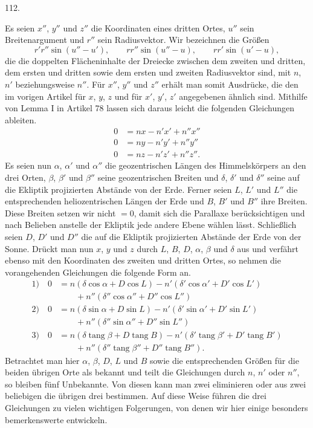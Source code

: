 \par{}\medskip
{}
\begin{center}112.\end{center}
Es seien $x''$, $y''$ und $z''$ die Koordinaten eines dritten Ortes, $u''$ sein Breitenargument und $r''$ sein Radiusvektor. Wir bezeichnen die Größen
\[
r'r''\sin(u''-u'),\qquad rr''\sin(u''-u),\qquad rr'\sin(u'-u),
\]
die die doppelten Flächeninhalte der Dreiecke zwischen dem zweiten und dritten, dem ersten und dritten sowie dem ersten und zweiten Radiusvektor sind, mit $n$, $n'$ beziehungsweise $n''$. Für $x''$, $y''$ und $z''$ erhält man somit Ausdrücke, die den im vorigen Artikel für $x$, $y$, $z$ und für $x'$, $y'$, $z'$ angegebenen ähnlich sind. Mithilfe von Lemma I in Artikel 78 lassen sich daraus leicht die folgenden Gleichungen ableiten.
\[
\begin{aligned}
0&=nx-n'x'+n''x''\\
0&=ny-n'y'+n''y''\\
0&=nz-n'z'+n''z''.
\end{aligned}
\]
Es seien nun $\alpha$, $\alpha'$ und $\alpha''$ die geozentrischen Längen des Himmelskörpers an den drei Orten, $\beta$, $\beta'$ und $\beta''$ seine geozentrischen Breiten und $\delta$, $\delta'$ und $\delta''$ seine auf die Ekliptik projizierten Abstände von der Erde. Ferner seien $L$, $L'$ und $L''$ die entsprechenden heliozentrischen Längen der Erde und $B$, $B'$ und $B''$ ihre Breiten. Diese Breiten setzen wir nicht $=0$, damit sich die Parallaxe berücksichtigen und nach Belieben anstelle der Ekliptik jede andere Ebene wählen lässt. Schließlich seien $D$, $D'$ und $D''$ die auf die Ekliptik projizierten Abstände der Erde von der Sonne. Drückt man nun $x$, $y$ und $z$ durch $L$, $B$, $D$, $\alpha$, $\beta$ und $\delta$ aus und verfährt ebenso mit den Koordinaten des zweiten und dritten Ortes, so nehmen die vorangehenden Gleichungen die folgende Form an.
\[
\begin{aligned}
1)\quad 0&=n(\delta\cos\alpha+D\cos L)-n'(\delta'\cos\alpha'+D'\cos L')\\
&\qquad+n''(\delta''\cos\alpha''+D''\cos L'')\\[.5ex]
2)\quad 0&=n(\delta\sin\alpha+D\sin L)-n'(\delta'\sin\alpha'+D'\sin L')\\
&\qquad+n''(\delta''\sin\alpha''+D''\sin L'')\\[.5ex]
3)\quad 0&=n(\delta\operatorname{tang}\beta+D\operatorname{tang}B)-n'(\delta'\operatorname{tang}\beta'+D'\operatorname{tang}B')\\
&\qquad+n''(\delta''\operatorname{tang}\beta''+D''\operatorname{tang}B'').
\end{aligned}
\]
Betrachtet man hier $\alpha$, $\beta$, $D$, $L$ und $B$ sowie die entsprechenden Größen für die beiden übrigen Orte als bekannt und teilt die Gleichungen durch $n$, $n'$ oder $n''$, so bleiben fünf Unbekannte. Von diesen kann man zwei eliminieren oder aus zwei beliebigen die übrigen drei bestimmen. Auf diese Weise führen die drei Gleichungen zu vielen wichtigen Folgerungen, von denen wir hier einige besonders bemerkenswerte entwickeln.
